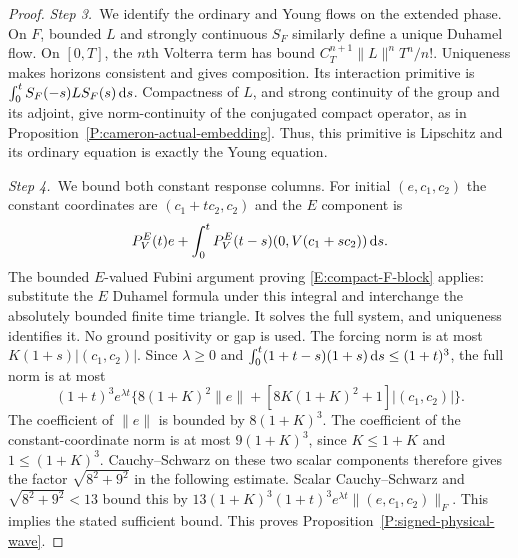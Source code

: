 \begin{proof}
  \medskip
  \noindent\textit{Step 3.~}We identify the ordinary and Young flows on the
  extended phase.
  On $F$, bounded $L$ and strongly continuous $S_F$ similarly define a unique
  Duhamel flow. On $[0,T]$, the $n$th Volterra term has bound
  $C_T^{n+1}\|L\|^nT^n/n!$. Uniqueness makes horizons consistent and gives
  composition. Its interaction primitive is $\int_0^t S_F(-s)LS_F(s)\,\mathrm{d} s$.
  Compactness of $L$, and strong continuity of the group and its adjoint, give
  norm-continuity of the conjugated compact operator, as in
  Proposition~\ref{P:cameron-actual-embedding}. Thus, this primitive is
  Lipschitz and its ordinary equation is exactly the Young equation.


  \medskip
  \noindent\textit{Step 4.~}We bound both constant response columns.
  For initial $(e,c_1,c_2)$ the constant coordinates are $(c_1+tc_2,c_2)$ and
  the $E$ component is
  \[
    P_V^E(t)e+\int_0^t P_V^E(t-s)(0,V(c_1+sc_2))\,\mathrm{d} s .
  \]
  The bounded $E$-valued Fubini argument proving \eqref{E:compact-F-block}
  applies: substitute the $E$ Duhamel formula under this integral and
  interchange the absolutely bounded finite time triangle. It solves the full
  system, and uniqueness identifies it. No ground positivity or gap is used. The
  forcing norm is at most $K(1+s)|(c_1,c_2)|$. Since $\lambda \ge 0$ and
  $\int_0^t(1+t-s)(1+s)\,\mathrm{d} s \le (1+t)^3$, the full norm is at most
  \[
    (1+t)^3e^{\lambda t}
    \{8(1+K)^2\|e\|+[8K(1+K)^2+1]|(c_1,c_2)|\}.
  \]
  The coefficient of $\|e\|$ is bounded by $8(1+K)^3$. The coefficient of the
  constant-coordinate norm is at most $9(1+K)^3$, since $K\le1+K$ and
  $1\le(1+K)^3$. Cauchy--Schwarz on these two scalar components therefore
  gives the factor $\sqrt{8^2+9^2}$ in the following estimate.
  Scalar Cauchy--Schwarz and $\sqrt{8^2+9^2} < 13$ bound this by
  $13(1+K)^3(1+t)^3e^{\lambda t}\|(e,c_1,c_2)\|_F$. This implies the stated
  sufficient bound. This proves Proposition~\ref{P:signed-physical-wave}.
\end{proof}
